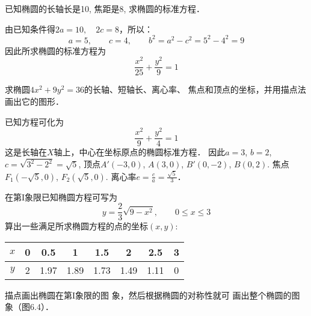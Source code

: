 \begin{figure}[htp]\centering
    \centering
{}
    \caption{}
    \end{figure}


\begin{example}
    已知椭圆的长轴长是10, 焦距是8, 求椭圆的标准方程．
\end{example}

\begin{solution}
    由已知条件得$2a=10,\quad 2c=8$，所以：
\[a=5,\qquad c=4,\qquad b^2=a^2-c^2=5^2-4^2=9\]
因此所求椭圆的标准方程为
\[\frac{x^2}{25}+\frac{y^2}{9}=1\]
\end{solution}

\begin{example}
    求椭圆$4x^2+9y^2=36$的长轴、短轴长、离心率、
焦点和顶点的坐标，并用描点法画出它的图形．
\end{example}

\begin{solution}
    已知方程可化为
    \[\frac{x^2}{9}+\frac{y^2}{4}=1\]
这是长轴在$X$轴上，中心在坐标原点的椭圆标准方程．
因此$a=3$, $b=2$, $c=\sqrt{3^2-2^2}=\sqrt{5}$, 顶点$A'(-3,
0)$, $A(3,0)$, $B'(0,-2)$, $B(0,2)$. 焦点
$F_1(-\sqrt{5},0)$, $F_2(\sqrt{5},0)$. 离心率$e=\frac{c}{a}=\frac{\sqrt{5}}{3}$．

在第I象限已知椭圆方程可写为
\[y=\frac{2}{3}\sqrt{9-x^2},\qquad 0\le x\le 3\]
算出一些满足所求椭圆方程的点的坐标$(x,y)$:
\begin{center}
    \begin{tabular}{cccccccc}
\hline
$x$&0&0.5&1&1.5&2&2.5&3\\
\hline
$y$&2&1.97&1.89&1.73&1.49&1.11&0\\
\hline
    \end{tabular}
\end{center}
描点画出椭圆在第I象限的图
象，然后根据椭圆的对称性就可
画出整个椭圆的图象（图6.4）．
\end{solution}

